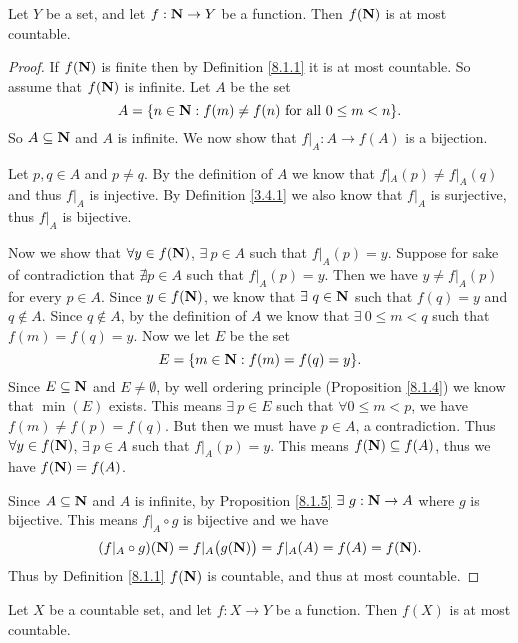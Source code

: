 \begin{proposition}\label{8.1.8}
    Let \(Y\) be a set, and let \(f : \mathbf{N} \to Y\) be a function.
    Then \(f(\mathbf{N})\) is at most countable.
\end{proposition}

\begin{proof}
    If \(f(\mathbf{N})\) is finite then by Definition \ref{8.1.1} it is at most countable.
    So assume that \(f(\mathbf{N})\) is infinite.
    Let \(A\) be the set
    \[
        A = \{n \in \mathbf{N} : f(m) \neq f(n) \text{ for all } 0 \leq m < n\}.
    \]
    So \(A \subseteq \mathbf{N}\) and \(A\) is infinite.
    We now show that \(f|_A : A \to f(A)\) is a bijection.

    Let \(p, q \in A\) and \(p \neq q\).
    By the definition of \(A\) we know that \(f|_A(p) \neq f|_A(q)\) and thus \(f|_A\) is injective.
    By Definition \ref{3.4.1} we also know that \(f|_A\) is surjective, thus \(f|_A\) is bijective.

    Now we show that \(\forall y \in f(\mathbf{N})\), \(\exists\ p \in A\) such that \(f|_A(p) = y\).
    Suppose for sake of contradiction that \(\nexists p \in A\) such that \(f|_A(p) = y\).
    Then we have \(y \neq f|_A(p)\) for every \(p \in A\).
    Since \(y \in f(\mathbf{N})\), we know that \(\exists\ q \in \mathbf{N}\) such that \(f(q) = y\) and \(q \notin A\).
    Since \(q \notin A\), by the definition of \(A\) we know that \(\exists\ 0 \leq m < q\) such that \(f(m) = f(q) = y\).
    Now we let \(E\) be the set
    \[
        E = \{m \in \mathbf{N} : f(m) = f(q) = y\}.
    \]
    Since \(E \subseteq \mathbf{N}\) and \(E \neq \emptyset\), by well ordering principle (Proposition \ref{8.1.4}) we know that \(\min(E)\) exists.
    This means \(\exists\ p \in E\) such that \(\forall 0 \leq m < p\), we have \(f(m) \neq f(p) = f(q)\).
    But then we must have \(p \in A\), a contradiction.
    Thus \(\forall y \in f(\mathbf{N})\), \(\exists\ p \in A\) such that \(f|_A(p) = y\).
    This means \(f(\mathbf{N}) \subseteq f(A)\), thus we have \(f(\mathbf{N}) = f(A)\).

    Since \(A \subseteq \mathbf{N}\) and \(A\) is infinite, by Proposition \ref{8.1.5} \(\exists\ g : \mathbf{N} \to A\) where \(g\) is bijective.
    This means \(f|_A \circ g\) is bijective and we have
    \[
        (f|_A \circ g)(\mathbf{N}) = f|_A\big(g(\mathbf{N})\big) = f|_A(A) = f(A) = f(\mathbf{N}).
    \]
    Thus by Definition \ref{8.1.1} \(f(\mathbf{N})\) is countable, and thus at most countable.
\end{proof}

\begin{corollary}\label{8.1.9}
    Let \(X\) be a countable set, and let \(f : X \to Y\) be a function.
    Then \(f(X)\) is at most countable.
\end{corollary}

